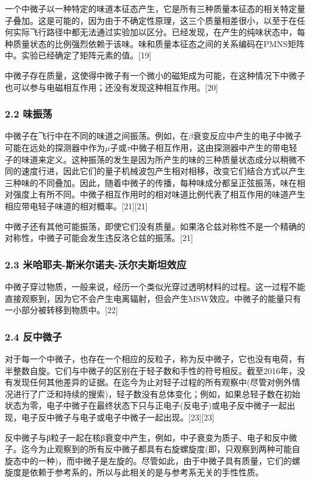 一个中微子以一种特定的味道本征态产生，它是所有三种质量本征态的相关特定量子叠加。这是可能的，因为由于不确定性原理，这三个质量相差很小，以至于在任何实际飞行路径中都无法通过实验加以区分。已经发现，在产生的纯味状态中，每种质量状态的比例强烈依赖于该味。味和质量本征态之间的关系编码在PMNS矩阵中。实验已经确定了矩阵元素的值。[19]

中微子存在质量，这使得中微子有一个微小的磁矩成为可能，在这种情况下中微子也可以参与电磁相互作用；还没有发现这种相互作用。[20]

\subsubsection{2.2 味振荡}
中微子在飞行中在不同的味道之间振荡。例如，在$\beta$衰变反应中产生的电子中微子可能在远处的探测器中作为$\mu$子或$\tau$中微子相互作用，这由探测器中产生的带电轻子的味道来定义。这种振荡的发生是因为所产生的味的三种质量状态成分以稍微不同的速度行进，因此它们的量子机械波包产生相对相移，改变它们结合方式以产生三种味的不同叠加。因此，随着中微子的传播，每种味成分都呈正弦振荡，味在相对强度上有所不同。中微子相互作用时的相对味道比例代表了相互作用的味道产生相应带电轻子味道的相对概率。[21][21]

中微子还有其他可能振荡，即使它们没有质量。如果洛仑兹对称性不是一个精确的对称性，中微子可能会发生违反洛仑兹的振荡。[21]

\subsubsection{2.3 米哈耶夫-斯米尔诺夫-沃尔夫斯坦效应}
中微子穿过物质，一般来说，经历一个类似光穿过透明材料的过程。这一过程不能直接观察到，因为它不会产生电离辐射，但会产生MSW效应。中微子的能量只有一小部分被转移到物质中。[22]

\subsubsection{2.4 反中微子}
对于每一个中微子，也存在一个相应的反粒子，称为反中微子，它也没有电荷，有半整数自旋。它们与中微子的区别在于轻子数和手性的符号相反。截至2016年，没有发现任何其他差异的证据。在迄今为止对轻子过程的所有观察中(尽管对例外情况进行了广泛和持续的搜索)，轻子数没有总体变化；例如，如果总轻子数在初始状态为零，电子中微子在最终状态下只与正电子(反电子)或电子反中微子一起出现，电子反中微子与电子或电子中微子一起出现。[23][23]

反中微子与β粒子一起在核β衰变中产生，例如，中子衰变为质子、电子和反中微子。迄今为止观察到的所有反中微子都具有右旋螺旋度(即，只观察到两种可能自旋态中的一种)，而中微子是左旋的。尽管如此，由于中微子具有质量，它们的螺旋度是依赖于参考系的，所以与此相关的是与参考系无关的手性性质。

